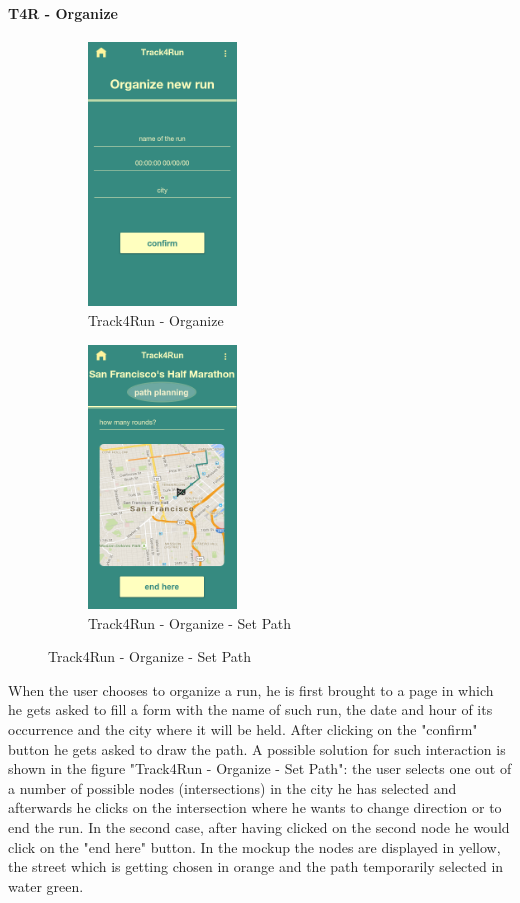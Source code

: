    \paragraph{T4R - Organize}
\begin{figure}[H]
\centering
\begin{subfigure}{.5\textwidth}
\centering
    \includegraphics[width=.9\linewidth, height = 7cm, keepaspectratio]{./Images/Mockups/Track4Run/T4R_Organize.png}    
    \caption{Track4Run - Organize}
  \end{subfigure}%
\begin{subfigure}{.5\textwidth}
\centering
    \includegraphics[width=.9\linewidth, height = 7cm, keepaspectratio]{./Images/Mockups/Track4Run/T4R_Organize_SetPath.png}
    \caption{Track4Run - Organize - Set Path}
  \end{subfigure}
\end{figure}

  When the user chooses to organize a run, he is first brought to a page in which he gets asked to fill a form with the name of such run, the date and hour of its occurrence and the city where it will be held. After clicking on the "confirm" button he gets asked to draw the path. A possible solution for such interaction is shown in the figure "Track4Run - Organize - Set Path": the user selects one out of a number of possible nodes (intersections) in the city he has selected and afterwards he clicks on the intersection where he wants to change direction or to end the run. In the second case, after having clicked on the second node he would click on the "end here" button. In the mockup the nodes are displayed in yellow, the street which is getting chosen in orange and the path temporarily selected in water green.




